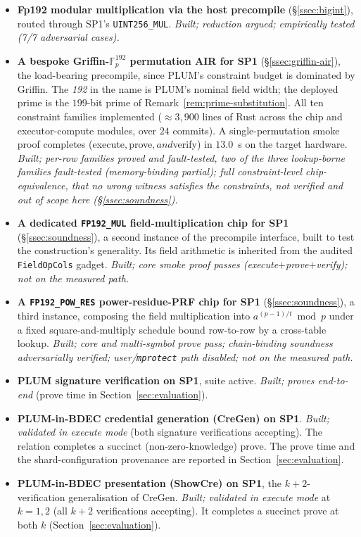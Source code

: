 \begin{itemize}
  \item \textbf{Fp192 modular multiplication via the host precompile}
  (\S\ref{ssec:bigint}), routed through SP1's \texttt{UINT256\_MUL}. \emph{Built; reduction argued; empirically tested (7/7 adversarial cases).}
  \item \textbf{A bespoke Griffin-$\mathbb{F}_p^{192}$ permutation AIR for SP1} (\S\ref{ssec:griffin-air}), the load-bearing precompile, since PLUM's constraint budget is dominated by Griffin. The \emph{192} in the name is PLUM's nominal field width; the deployed prime is the $199$-bit prime of Remark~\ref{rem:prime-substitution}. All ten constraint families implemented ($\approx 3{,}900$ lines of Rust across the chip and executor-compute modules, over $24$ commits). A single-permutation smoke proof completes (execute$, $prove$, and $verify) in $13.0$~s on the target hardware. 
  \emph{Built; per-row families proved and fault-tested, two of the three lookup-borne families fault-tested (memory-binding partial); full constraint-level chip-equivalence, that no wrong witness satisfies the constraints, not verified and out of scope here (\S\ref{ssec:soundness}).}
  \item \textbf{A dedicated \texttt{FP192\_MUL} field-multiplication chip for SP1} (\S\ref{ssec:soundness}), a second instance of the precompile interface, built to test the construction's generality. Its field arithmetic is inherited from the audited \texttt{FieldOpCols} gadget. \emph{Built; core smoke proof passes (execute$+$prove$+$verify); not on the measured path.}
  \item \textbf{A \texttt{FP192\_POW\_RES} power-residue-PRF chip for SP1} (\S\ref{ssec:soundness}), a third instance, composing the field multiplication into $a^{(p-1)/t}\bmod p$ under a fixed square-and-multiply schedule bound row-to-row by a cross-table lookup. \emph{Built; core and multi-symbol prove pass; chain-binding soundness adversarially verified; user/\texttt{mprotect} path disabled; not on the measured path.}
  \item \textbf{PLUM signature verification on SP1}, suite active. \emph{Built; proves end-to-end} (prove time in Section~\ref{sec:evaluation}).
  \item \textbf{PLUM-in-BDEC credential generation (CreGen) on SP1}. \emph{Built; validated in execute mode} (both signature verifications accepting). The relation completes a succinct (non-zero-knowledge) prove. The prove time and the shard-configuration provenance are reported in Section~\ref{sec:evaluation}.
  \item \textbf{PLUM-in-BDEC presentation (ShowCre) on SP1}, the $k+2$-verification generalisation of CreGen. \emph{Built; validated in execute mode} at $k=1,2$ (all $k+2$ verifications accepting). It completes a succinct prove at both $k$ (Section~\ref{sec:evaluation}).
\end{itemize}

